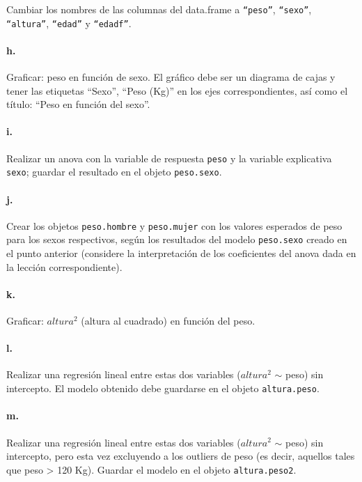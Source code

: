 \documentclass[]{article}
\begin{document}
Cambiar los nombres de las columnas del data.frame a \texttt{``peso''},
\texttt{``sexo''}, \texttt{``altura''}, \texttt{``edad''} y
\texttt{``edadf''}.

\paragraph{h.}

Graficar: peso en función de sexo. El gráfico debe ser un diagrama de
cajas y tener las etiquetas ``Sexo'', ``Peso (Kg)'' en los ejes
correspondientes, así como el título: ``Peso en función del sexo''.

\paragraph{i.}

Realizar un anova con la variable de respuesta \texttt{peso} y la
variable explicativa \texttt{sexo}; guardar el resultado en el objeto
\texttt{peso.sexo}.

\paragraph{j.}

Crear los objetos \texttt{peso.hombre} y \texttt{peso.mujer} con los
valores esperados de peso para los sexos respectivos, según los
resultados del modelo \texttt{peso.sexo} creado en el punto anterior
(considere la interpretación de los coeficientes del anova dada en la
lección correspondiente).

\paragraph{k.}

Graficar: $altura ^ 2$ (altura al cuadrado) en función del peso.

\paragraph{l.}

Realizar una regresión lineal entre estas dos variables ($altura ^ 2$
\ensuremath{\sim} peso) sin intercepto. El modelo obtenido debe
guardarse en el objeto \texttt{altura.peso}.

\paragraph{m.}

Realizar una regresión lineal entre estas dos variables ($altura ^ 2$
\ensuremath{\sim} peso) sin intercepto, pero esta vez excluyendo a los
outliers de peso (es decir, aquellos tales que peso \textgreater{} 120
Kg). Guardar el modelo en el objeto \texttt{altura.peso2}.
\end{document}
